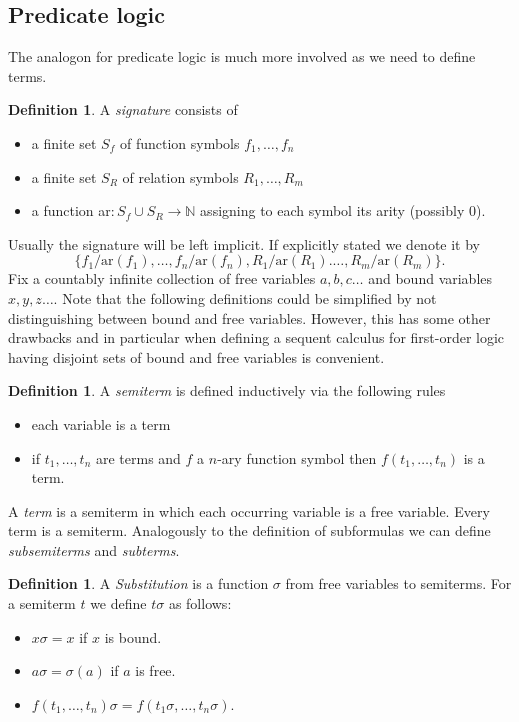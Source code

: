 \documentclass[a4paper,11pt]{report}
\theoremstyle{definition}
\theoremstyle{definition}
\theoremstyle{definition}
\theoremstyle{definition}
\theoremstyle{definition}
\newtheorem{definition}[theorem]{Definition}
\theoremstyle{definition}
\theoremstyle{definition}
\begin{document}
	\subsection{Predicate logic}
	
	The analogon for predicate logic is much more involved as we need to define terms.
	
	\begin{definition}
		A \textit{signature} consists of
		\begin{itemize}
			\item a finite set $S_f$ of function symbols $f_1, \dots, f_n$
			\item a finite set $S_R$ of relation symbols $R_1,\dots, R_m$
			\item  a function ar$: S_f\cup S_R\to \mathbb{N}$ assigning to each symbol its arity (possibly 0). 
		\end{itemize}
	\end{definition}
	
	\noindent Usually the signature will be left implicit. If explicitly stated we denote it by $$\{f_1/\text{ar}(f_1),\dots,f_n/\text{ar}(f_n), R_1/\text{ar}(R_1).\dots,R_m/\text{ar}(R_m)\}.$$
	Fix a countably infinite collection of free variables $a, b, c\dots$ and bound variables $x, y, z\dots$.
	Note that the following definitions could be simplified by not distinguishing between bound and free variables. However, this has some other drawbacks and in particular when defining a sequent calculus for first-order logic having disjoint sets of bound and free variables is convenient.
	
	\begin{definition}
		A \textit{semiterm} is defined inductively via the following rules
		\begin{itemize}
			\item each variable is a term
			\item if $t_1,\dots,t_n$ are terms and $f$ a $n$-ary function symbol then $f(t_1, \dots, t_n)$ is a term.
		\end{itemize}
		A \textit{term} is a semiterm in which each occurring variable is a free variable. Every term is a semiterm. Analogously to the definition of subformulas we can define \textit{subsemiterms} and \textit{subterms}.
	\end{definition}

	\begin{definition}
		A \textit{Substitution} is a function $\sigma$ from free variables to semiterms. For a semiterm $t$ we define $t\sigma$ as follows:
		\begin{itemize}
			\item $x\sigma = x$ if $x$ is bound.
			\item $a\sigma = \sigma(a)$ if $a$ is free.
			\item $f(t_1,\dots,t_n)\sigma = f(t_1\sigma,\dots,t_n\sigma)$.
		\end{itemize}
	\end{definition}
	
\end{document}
